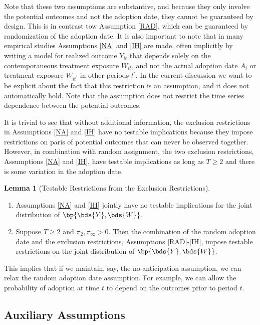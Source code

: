 \documentclass[12pt]{article}
\theoremstyle{definition}
\newtheorem{lemma}[theorem]{Lemma}
\begin{document}
Note that these two assumptions are substantive, and because they only involve the potential outcomes and not the adoption date, they cannot be guaranteed by design. This is in contrast tow Assumption \ref{RAD}, which can be guaranteed by randomization of the adoption date. It is also important to note that in many empirical studies Assumptions \ref{NA} and \ref{IH} are made, often implicitly by writing a model for realized outcome $Y_{it}$ that depends solely on the contemporaneous treatment exposure $W_{it}$, and not the actual adoption date $A_i$ or treatment exposure $W_{i t^{\prime}}$ in other periods $t^{\prime}$. In the current discussion we want to be explicit about the fact that this restriction is an assumption, and it does not automatically hold. Note that the assumption does not restrict the time series dependence between the potential outcomes. 

It is trivial to see that without additional information, the exclusion restrictions in Assumptions \ref{NA} and \ref{IH} have no testable implications because they impose restrictions on paris of potential outcomes that can never be observed together. However, in combination with random assignment, the two exclusion restrictions, Assumptions \ref{NA} and \ref{IH}, have testable implications as long as $T \geq 2$ and there is some variation in the adoption date. 

\begin{lemma}[Testable Restrictions from the Exclusion Restrictions]
\begin{enumerate}[topsep=0pt, leftmargin=20pt, itemsep=0pt, label=(\arabic*)]
    \setlength{\parskip}{10pt} 
    \item Assumptions \ref{NA} and \ref{IH} jointly have no testable implications for the joint distribution of $\bp{\bds{Y}, \bds{W}}$.
    \item Suppose $T \geq 2$ and $\pi_2, \pi_{\infty} > 0$. Then the combination of the random adoption date and the exclusion restrictions, Assumptions \ref{RAD}-\ref{IH}, impose testable restrictions on the joint distribution of $\bp{\bds{Y}, \bds{W}}$.
\end{enumerate}
\end{lemma}

This implies that if we maintain, say, the no-anticipation assumption, we can relax the random adoption date assumption. For example, we can allow the probability of adoption at time $t$ to depend on the outcomes prior to period $t$.

\subsection{Auxiliary Assumptions}
\end{document}
